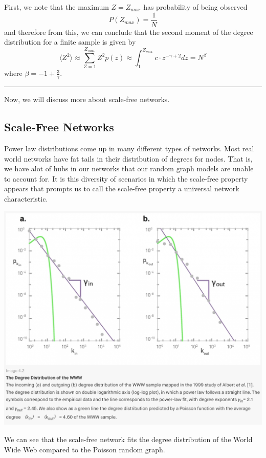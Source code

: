 \documentclass[twoside]{article}
\newenvironment{proof}{{\bf Proof:}}{\hfill\rule{2mm}{2mm}}
\begin{document}
\begin{proof} First, we note that the maximum $Z = Z_{max}$ has probability of being observed 
$$
P(Z_{max}) = \frac{1}{N}
$$
and therefore from this, we can conclude that the second moment of the degree distribution for a finite sample is given by 
$$
\langle Z^2 \rangle \approx \sum_{Z=1}^{Z_{max}}Z^2p(z) \approx \int_{1}^{Z_{max}}c\cdot z^{-\gamma + 2}dz =  N^{\beta}
$$
where $\beta = -1 + \frac{3}{\gamma}.$ 
\end{proof}


Now, we will discuss more about scale-free networks.
\subsection{Scale-Free Networks}

Power law distributions come up in many different types of networks. Most real world networks have fat tails in their distribution of degrees for nodes. That is, we have alot of hubs in our networks that our random graph models are unable to account for. It is this diversity of scenarios in which the scale-free property appears that prompts us to call the scale-free property a universal network characteristic.

\begin{center}
\includegraphics[scale=0.6]{WWW}
\end{center}

We can see that the scale-free network fits the degree distribution of the World Wide Web compared to the Poisson random graph.
\end{document}
